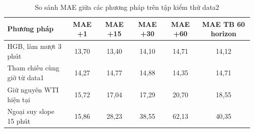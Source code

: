 \begin{table}[htbp]
        \centering
        \caption{So sánh MAE giữa các phương pháp trên tập kiểm thử data2}
        \label{tab:mae_comparison}
        \begin{tabular}{|l|c|c|c|c|c|}
            \hline
            \textbf{Phương pháp} & \textbf{MAE +1} & \textbf{MAE +15} & \textbf{MAE +30} & \textbf{MAE +60} & \textbf{MAE TB 60 horizon} \\
            \hline
            HGB, làm mượt 3 phút & 13,70 & 13,40 & 14,10 & 14,71 & 14,12 \\
            Tham chiếu cùng giờ từ data1 & 14,27 & 14,77 & 14,88 & 14,35 & 14,71 \\
            Giữ nguyên WTI hiện tại & 15,72 & 17,04 & 17,29 & 20,70 & 18,55 \\
            Ngoại suy slope 15 phút & 15,86 & 28,23 & 38,55 & 62,13 & 40,35 \\
            \hline
        \end{tabular}
    \end{table}